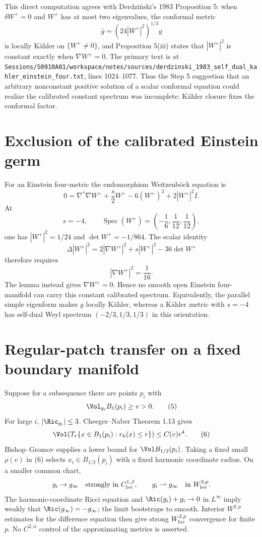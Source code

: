 This direct computation agrees with Derdzi\'nski's 1983 Proposition 5: when
$\delta W^+=0$ and $W^+$ has at most two eigenvalues, the conformal metric
\[
 \bar g=(24|W^+|^2)^{1/3}g
\]
is locally K\"ahler on $\{W^+\ne0\}$, and Proposition 5(iii) states that
$|W^+|^2$ is constant exactly when $\nabla W^+=0$.  The primary text is at
\texttt{Sessions/S0910A01/workspace/notes/sources/derdzinski\_1983\_self\_dual\_kahler\_einstein\_four.txt}, lines 1024--1077.  Thus the Step 5 suggestion that an arbitrary nonconstant positive solution of a scalar conformal equation could realize the calibrated constant spectrum was incomplete: K\"ahler closure fixes the conformal factor.

\section{Exclusion of the calibrated Einstein germ}
For an Einstein four-metric the endomorphism Weitzenb\"ock equation is
\[
 0=\nabla^*\nabla W^+ +\frac{s}{2}W^+-6(W^+)^2
       +2|W^+|^2 I.
\]
At
\[
 s=-4,
 \qquad
 \operatorname{Spec}(W^+)=\left(-\frac16,\frac1{12},\frac1{12}\right),
\]
one has $|W^+|^2=1/24$ and $\det W^+=-1/864$.  The scalar identity
\[
 \Delta|W^+|^2=2|\nabla W^+|^2+s|W^+|^2-36\det W^+
\]
therefore requires
\[
 |\nabla W^+|^2=\frac1{16}.                             \tag{4}
\]
The lemma instead gives $\nabla W^+=0$.  Hence no smooth open Einstein four-manifold can carry this constant calibrated spectrum.  Equivalently, the parallel simple eigenform makes $g$ locally K\"ahler, whereas a K\"ahler metric with $s=-4$ has self-dual Weyl spectrum
$(-2/3,1/3,1/3)$ in this orientation.

\section{Regular-patch transfer on a fixed boundary manifold}
Suppose for a subsequence there are points $p_i$ with
\[
 \Vol_{g_i}B_1(p_i)\ge v>0.                              \tag{5}
\]
For large $i$, $|\Ric_{g_i}|\le3$.  Cheeger--Naber Theorem 1.13 gives
\[
 \Vol\!\left(T_r\{x\in B_1(p_i):r_h(x)\le r\}\right)
 \le C(v)r^4.                                             \tag{6}
\]
Bishop--Gromov supplies a lower bound for $\Vol B_{1/2}(p_i)$.  Taking a
fixed small $\rho(v)$ in (6) selects $x_i\in B_{1/2}(p_i)$ with a fixed
harmonic coordinate radius.  On a smaller common chart,
\[
 g_i\to g_\infty\quad\hbox{strongly in }C^{1,\beta}_{\rm loc},
 \qquad g_i\rightharpoonup g_\infty\quad\hbox{in }W^{2,p}_{\rm loc}.
\]
The harmonic-coordinate Ricci equation and
$\Ric(g_i)+g_i\to0$ in $L^\infty$ imply weakly that
$\Ric(g_\infty)=-g_\infty$; the limit bootstraps to smooth.  Interior
$W^{2,p}$ estimates for the difference equation then give strong
$W^{2,p}_{\rm loc}$ convergence for finite $p$.  No $C^{2,\alpha}$ control of
the approximating metrics is asserted.

